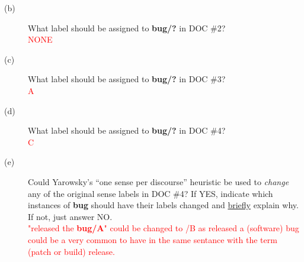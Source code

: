 \documentclass[11pt]{article}
\begin{document}
\begin{enumerate}
\begin{description}
\item[(b)] What label should be assigned to {\bf bug/?} in DOC \#2?  \\
\textcolor{red}{NONE} 

\item[(c)] What label should be assigned to {\bf bug/?} in DOC \#3?  \\
\textcolor{red}{A} 

\item[(d)] What label should be assigned to {\bf bug/?} in DOC \#4?  \\
\textcolor{red}{C}


\item[(e)] Could Yarowsky's ``one sense per discourse'' heuristic be used to
{\it change} any of the original sense labels in DOC \#4? If YES, indicate which
instances of {\bf bug} should have their labels changed  and
\underline{briefly} explain why.   If not, just answer NO.\\
\textcolor{red}{"released the {\bf bug/A}" could be changed to /B as released a (software) bug could be a very common to have in the same sentance with the term (patch or build) release.}

\end{description}




\end{enumerate}
\end{document}
